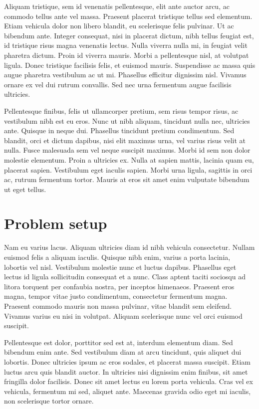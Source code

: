 \documentclass{article}
\begin{document}
Aliquam tristique, sem id venenatis pellentesque, elit ante auctor arcu, ac commodo tellus ante vel massa. Praesent placerat tristique tellus sed elementum. Etiam vehicula dolor non libero blandit, eu scelerisque felis pulvinar. Ut ac bibendum ante. Integer consequat, nisi in placerat dictum, nibh tellus feugiat est, id tristique risus magna venenatis lectus. Nulla viverra nulla mi, in feugiat velit pharetra dictum. Proin id viverra mauris. Morbi a pellentesque nisl, at volutpat ligula. Donec tristique facilisis felis, et euismod mauris. Suspendisse ac massa quis augue pharetra vestibulum ac ut mi. Phasellus efficitur dignissim nisl. Vivamus ornare ex vel dui rutrum convallis. Sed nec urna fermentum augue facilisis ultricies.

Pellentesque finibus, felis ut ullamcorper pretium, sem risus tempor risus, ac vestibulum nibh est eu eros. Nunc ut nibh aliquam, tincidunt nulla nec, ultricies ante. Quisque in neque dui. Phasellus tincidunt pretium condimentum. Sed blandit, orci et dictum dapibus, nisi elit maximus urna, vel varius risus velit at nulla. Fusce malesuada sem vel neque suscipit maximus. Morbi id sem non dolor molestie elementum. Proin a ultricies ex. Nulla at sapien mattis, lacinia quam eu, placerat sapien. Vestibulum eget iaculis sapien. Morbi urna ligula, sagittis in orci ac, rutrum fermentum tortor. Mauris at eros sit amet enim vulputate bibendum ut eget tellus.

\section{Problem setup}
Nam eu varius lacus. Aliquam ultricies diam id nibh vehicula consectetur. Nullam euismod felis a aliquam iaculis. Quisque nibh enim, varius a porta lacinia, lobortis vel nisl. Vestibulum molestie nunc et luctus dapibus. Phasellus eget lectus id ligula sollicitudin consequat et a nunc. Class aptent taciti sociosqu ad litora torquent per confaubia nostra, per inceptos himenaeos. Praesent eros magna, tempor vitae justo condimentum, consectetur fermentum magna. Praesent commodo mauris non massa pulvinar, vitae blandit sem eleifend. Vivamus varius eu nisi in volutpat. Aliquam scelerisque nunc vel orci euismod suscipit.

Pellentesque est dolor, porttitor sed est at, interdum elementum diam. Sed bibendum enim ante. Sed vestibulum diam at arcu tincidunt, quis aliquet dui lobortis. Donec ultricies ipsum ac eros sodales, et placerat massa suscipit. Etiam luctus arcu quis blandit auctor. In ultricies nisi dignissim enim finibus, sit amet fringilla dolor facilisis. Donec sit amet lectus eu lorem porta vehicula. Cras vel ex vehicula, fermentum mi sed, aliquet ante. Maecenas gravida odio eget mi iaculis, non scelerisque tortor ornare.
\end{document}

